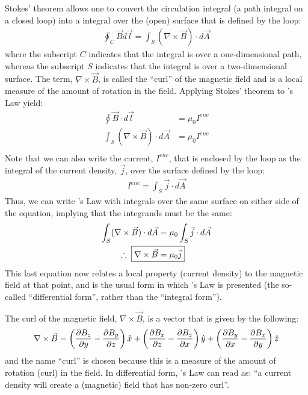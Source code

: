 Stokes' theorem allows one to convert the circulation integral (a path integral on a closed loop) into a integral over the (open) surface that is defined by the loop:
\begin{align*}
\oint_C \vec B d\vec l = \int_S (\nabla \times \vec B) \cdot d\vec A
\end{align*}
where the subscript $C$ indicates that the integral is over a one-dimensional path, whereas the subscript $S$ indicates that the integral is over a two-dimensional surface. The term, $\nabla \times \vec B$, is called the ``curl'' of the magnetic field and is a local measure of the amount of rotation in the field. Applying Stokes' theorem to \ampere's Law yield:
\begin{align*}
\oint \vec B \cdot d\vec l &= \mu_0 I^{enc}\\
\int_S (\nabla \times \vec B) \cdot d\vec A &= \mu_0 I^{enc}\\
\end{align*}
Note that we can also write the current, $I^{enc}$, that is enclosed by the loop as the integral of the current density, $\vec j$, over the surface defined by the loop:
\begin{align*}
I^{enc}=\int _S \vec j \cdot d\vec A
\end{align*}
Thus, we can write \ampere's Law with integrals over the same surface on either side of the equation, implying that the integrands must be the same:
\begin{align*}
\int_S (\nabla \times \vec B) \cdot d\vec A &= \mu_0 \int _S \vec j \cdot d\vec A\\
\therefore\;\;\Aboxed{ \nabla \times \vec B &= \mu_0 \vec j}
\end{align*}
This last equation now relates a local property (current density) to the magnetic field at that point, and is the usual form in which \ampere's Law is presented (the so-called ``differential form'', rather than the ``integral form''). 

The curl of the magnetic field, $\nabla \times \vec B$, is a vector that is given by the following:
\begin{align*}
\nabla \times \vec B = \left(\frac{\partial B_z}{\partial y}-\frac{\partial B_y}{\partial z}\right)\hat x + \left(\frac{\partial B_x}{\partial z}-\frac{\partial B_z}{\partial x}\right)\hat y+\left(\frac{\partial B_y}{\partial x}-\frac{\partial B_x}{\partial y}\right)\hat z
\end{align*}
and the name ``curl'' is chosen because this is a measure of the amount of rotation (curl) in the field. In differential form, \ampere's Law can read as: ``a current density will create a (magnetic) field that has non-zero curl''.

